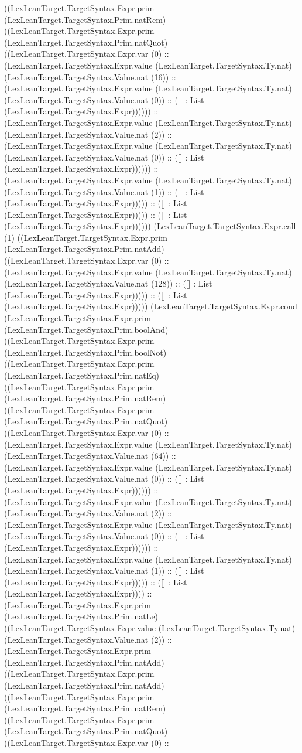 \documentclass[11pt]{article}
\begin{document}
((LexLeanTarget.TargetSyntax.Expr.prim (LexLeanTarget.TargetSyntax.Prim.natRem) ((LexLeanTarget.TargetSyntax.Expr.prim (LexLeanTarget.TargetSyntax.Prim.natQuot) ((LexLeanTarget.TargetSyntax.Expr.var (0) :: (LexLeanTarget.TargetSyntax.Expr.value (LexLeanTarget.TargetSyntax.Ty.nat) (LexLeanTarget.TargetSyntax.Value.nat (16)) :: (LexLeanTarget.TargetSyntax.Expr.value (LexLeanTarget.TargetSyntax.Ty.nat) (LexLeanTarget.TargetSyntax.Value.nat (0)) :: ([] : List (LexLeanTarget.TargetSyntax.Expr)))))) :: (LexLeanTarget.TargetSyntax.Expr.value (LexLeanTarget.TargetSyntax.Ty.nat) (LexLeanTarget.TargetSyntax.Value.nat (2)) :: (LexLeanTarget.TargetSyntax.Expr.value (LexLeanTarget.TargetSyntax.Ty.nat) (LexLeanTarget.TargetSyntax.Value.nat (0)) :: ([] : List (LexLeanTarget.TargetSyntax.Expr)))))) :: (LexLeanTarget.TargetSyntax.Expr.value (LexLeanTarget.TargetSyntax.Ty.nat) (LexLeanTarget.TargetSyntax.Value.nat (1)) :: ([] : List (LexLeanTarget.TargetSyntax.Expr))))) :: ([] : List (LexLeanTarget.TargetSyntax.Expr))))) :: ([] : List (LexLeanTarget.TargetSyntax.Expr)))))) (LexLeanTarget.TargetSyntax.Expr.call (1) ((LexLeanTarget.TargetSyntax.Expr.prim (LexLeanTarget.TargetSyntax.Prim.natAdd) ((LexLeanTarget.TargetSyntax.Expr.var (0) :: (LexLeanTarget.TargetSyntax.Expr.value (LexLeanTarget.TargetSyntax.Ty.nat) (LexLeanTarget.TargetSyntax.Value.nat (128)) :: ([] : List (LexLeanTarget.TargetSyntax.Expr))))) :: ([] : List (LexLeanTarget.TargetSyntax.Expr))))) (LexLeanTarget.TargetSyntax.Expr.cond (LexLeanTarget.TargetSyntax.Expr.prim (LexLeanTarget.TargetSyntax.Prim.boolAnd) ((LexLeanTarget.TargetSyntax.Expr.prim (LexLeanTarget.TargetSyntax.Prim.boolNot) ((LexLeanTarget.TargetSyntax.Expr.prim (LexLeanTarget.TargetSyntax.Prim.natEq) ((LexLeanTarget.TargetSyntax.Expr.prim (LexLeanTarget.TargetSyntax.Prim.natRem) ((LexLeanTarget.TargetSyntax.Expr.prim (LexLeanTarget.TargetSyntax.Prim.natQuot) ((LexLeanTarget.TargetSyntax.Expr.var (0) :: (LexLeanTarget.TargetSyntax.Expr.value (LexLeanTarget.TargetSyntax.Ty.nat) (LexLeanTarget.TargetSyntax.Value.nat (64)) :: (LexLeanTarget.TargetSyntax.Expr.value (LexLeanTarget.TargetSyntax.Ty.nat) (LexLeanTarget.TargetSyntax.Value.nat (0)) :: ([] : List (LexLeanTarget.TargetSyntax.Expr)))))) :: (LexLeanTarget.TargetSyntax.Expr.value (LexLeanTarget.TargetSyntax.Ty.nat) (LexLeanTarget.TargetSyntax.Value.nat (2)) :: (LexLeanTarget.TargetSyntax.Expr.value (LexLeanTarget.TargetSyntax.Ty.nat) (LexLeanTarget.TargetSyntax.Value.nat (0)) :: ([] : List (LexLeanTarget.TargetSyntax.Expr)))))) :: (LexLeanTarget.TargetSyntax.Expr.value (LexLeanTarget.TargetSyntax.Ty.nat) (LexLeanTarget.TargetSyntax.Value.nat (1)) :: ([] : List (LexLeanTarget.TargetSyntax.Expr))))) :: ([] : List (LexLeanTarget.TargetSyntax.Expr)))) :: (LexLeanTarget.TargetSyntax.Expr.prim (LexLeanTarget.TargetSyntax.Prim.natLe) ((LexLeanTarget.TargetSyntax.Expr.value (LexLeanTarget.TargetSyntax.Ty.nat) (LexLeanTarget.TargetSyntax.Value.nat (2)) :: (LexLeanTarget.TargetSyntax.Expr.prim (LexLeanTarget.TargetSyntax.Prim.natAdd) ((LexLeanTarget.TargetSyntax.Expr.prim (LexLeanTarget.TargetSyntax.Prim.natAdd) ((LexLeanTarget.TargetSyntax.Expr.prim (LexLeanTarget.TargetSyntax.Prim.natRem) ((LexLeanTarget.TargetSyntax.Expr.prim (LexLeanTarget.TargetSyntax.Prim.natQuot) ((LexLeanTarget.TargetSyntax.Expr.var (0) :: 
\end{document}
